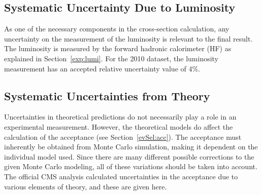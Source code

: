 \subsection{Systematic Uncertainty Due to Luminosity}
\label{anMeth:SystsLumi}


As one of the necessary components in the 
cross-section calculation, 
any uncertainty on the measurement of the luminosity 
is relevant to the final result.  
The luminosity is measured by the forward hadronic calorimeter (HF) 
as explained in Section~\ref{exp:lumi}.  
For the 2010 dataset, 
the luminosity measurement has an accepted 
relative uncertainty value of 4\%.  %

\subsection{Systematic Uncertainties from Theory}
\label{anMeth:SystsTheory}



Uncertainties in theoretical predictions do not 
necessarily play a role in an experimental measurement.  
However, the theoretical models do affect the 
calculation of the acceptance (see Section~\ref{evSel:acc}).  
The acceptance must inherently be obtained from 
Monte Carlo simulation, making it dependent on the 
individual model used.  
Since there are many different possible corrections 
to the given Monte Carlo modeling, 
all of these variations should be taken into account.  
The official CMS \Zee analysis calculated \cite{CMSWZ} 
uncertainties in the acceptance due to 
various elements of theory, 
and these are given here.  




